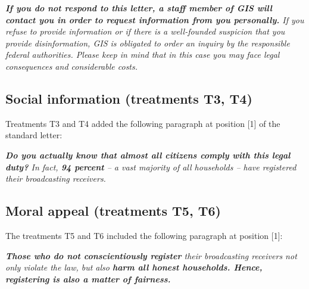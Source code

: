 \documentclass[preprint,inputenc=ansinew,doublespace,notheorems,wider]{jeea}
\begin{document}

\footnotesize{\noindent \textsl{\textbf{If you do not
respond to this letter, a staff member of GIS will contact you in
order to request information from you personally.} If you refuse
to provide information or if there is a well-founded suspicion that you provide disinformation, GIS is obligated to order an inquiry by the
responsible federal authorities. Please keep in mind that in this
case you may face legal consequences and considerable costs.}}

\newpage

\subsection{Social information (treatments T3, T4)}

\small{\noindent Treatments T3 and T4 added the following paragraph at position [1] of the standard letter:}

\footnotesize{\noindent \textsl{\textbf{Do you actually know
that almost all citizens comply with this legal duty?} In fact, \textbf{94
percent} -- a vast majority of all households -- have registered
their broadcasting receivers.}}\medskip

\subsection{Moral appeal (treatments T5, T6)}

\small{\noindent The treatments T5 and T6 included the following paragraph at position [1]:}

\footnotesize{\noindent \textsl{\textbf{Those who do not
conscientiously register} their broadcasting receivers not only violate
the law, but also \textbf{harm all honest households. Hence,
registering is also a matter of fairness.}}}\bigskip

\end{document}
